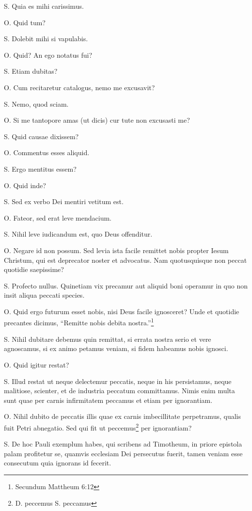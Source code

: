 \documentclass{article}
\begin{document}
S. Quia es mihi carissimus.

O. Quid tum?

S. Dolebit mihi si vapulabis.

O. Quid? An ego notatus fui?

S. Etiam dubitas?

O. Cum recitaretur catalogus, nemo me excusavit?

S. Nemo, quod sciam.

O. Si me tantopore amas (ut dicis) cur tute non excusasti me?

S. Quid causae dixissem?

O. Commentus esses aliquid.

S. Ergo mentitus essem?

O. Quid inde?

S. Sed ex verbo Dei mentiri vetitum est.

O. Fateor, sed erat leve mendacium.

S. Nihil leve iudicandum est, quo Deus offenditur.

O. Negare id non possum. Sed levia ista facile remittet nobis propter Iesum Christum, qui est deprecator noster et advocatus. Nam quotusquisque non peccat quotidie saepissime?

S. Profecto nullus. Quinetiam vix precamur aut aliquid boni operamur in quo non insit aliqua peccati species.

O. Quid ergo futurum esset nobis, nisi Deus facile ignosceret? Unde et quotidie precantes dicimus, ``Remitte nobis debita nostra.''\footnote{Secundum Mattheum 6:12}

S. Nihil dubitare debemus quin remittat, si errata nostra serio et vere agnoscamus, si ex animo petamus veniam, si fidem habeamus nobis ignosci.

O. Quid igitur restat?

S. Illud restat ut neque delectemur peccatis, neque in his persistamus, neque malitiose, scienter, et de industria peccatum committamus. Nimis enim multa sunt quae per carnis infirmitatem peccamus et etiam per ignorantiam.

O. Nihil dubito de peccatis illis quae ex carnis imbecillitate perpetramus, qualis fuit Petri abnegatio. Sed qui fit ut peccemus\footnote{D. peccemus S. peccamus} per ignorantiam?

S. De hoc Pauli exemplum habes, qui scribens ad Timotheum, in priore epistola palam profitetur se, quamvis ecclesiam Dei persecutus fuerit, tamen veniam esse consecutum quia ignorans id fecerit.
\end{document}
